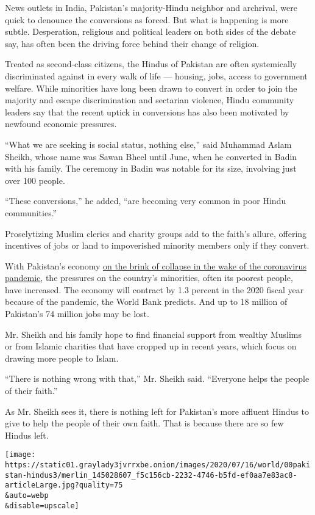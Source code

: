 News outlets in India, Pakistan's majority-Hindu neighbor and archrival,
were quick to denounce the conversions as forced. But what is happening
is more subtle. Desperation, religious and political leaders on both
sides of the debate say, has often been the driving force behind their
change of religion.

Treated as second-class citizens, the Hindus of Pakistan are often
systemically discriminated against in every walk of life --- housing,
jobs, access to government welfare. While minorities have long been
drawn to convert in order to join the majority and escape discrimination
and sectarian violence, Hindu community leaders say that the recent
uptick in conversions has also been motivated by newfound economic
pressures.

``What we are seeking is social status, nothing else,'' said Muhammad
Aslam Sheikh, whose name was Sawan Bheel until June, when he converted
in Badin with his family. The ceremony in Badin was notable for its
size, involving just over 100 people.

``These conversions,'' he added, ``are becoming very common in poor
Hindu communities.''

Proselytizing Muslim clerics and charity groups add to the faith's
allure, offering incentives of jobs or land to impoverished minority
members only if they convert.

With Pakistan's economy
\href{https://www.nytimes3xbfgragh.onion/2020/06/15/world/asia/pakistan-coronavirus-hospitals.html}{on
the brink of collapse in the wake of the coronavirus pandemic}, the
pressures on the country's minorities, often its poorest people, have
increased. The economy will contract by 1.3 percent in the 2020 fiscal
year because of the pandemic, the World Bank predicts. And up to 18
million of Pakistan's 74 million jobs may be lost.

Mr. Sheikh and his family hope to find financial support from wealthy
Muslims or from Islamic charities that have cropped up in recent years,
which focus on drawing more people to Islam.

``There is nothing wrong with that,'' Mr. Sheikh said. ``Everyone helps
the people of their faith.''

As Mr. Sheikh sees it, there is nothing left for Pakistan's more
affluent Hindus to give to help the people of their own faith. That is
because there are so few Hindus left.

\texttt{[image: https://static01.graylady3jvrrxbe.onion/images/2020/07/16/world/00pakistan-hindus3/merlin\_145028607\_f5c156cb-2232-4746-b5fd-ef0aa7e83ac8-articleLarge.jpg?quality=75\\\&auto=webp\\\&disable=upscale]}

